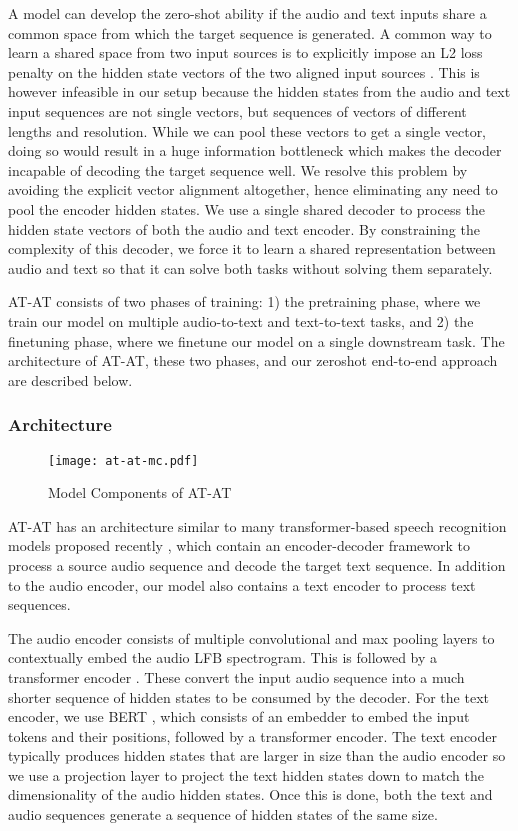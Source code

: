 \documentclass[letterpaper]{article} \usepackage{aaai21}  \usepackage{times}  \usepackage{helvet} \usepackage{courier}  \usepackage[hyphens]{url}  \usepackage{graphicx} \usepackage{booktabs}
\begin{document}
A model can develop the zero-shot ability if the audio and text inputs share a common space from which the target sequence is generated. A common way to learn a shared space from two input sources is to explicitly impose an L2 loss penalty on the hidden state vectors of the two aligned input sources \cite{denisov2020pretrained}. This is however infeasible in our setup because the hidden states from the audio and text input sequences are not single vectors, but sequences of vectors of different lengths and resolution. While we can pool these vectors to get a single vector, doing so would result in a huge information bottleneck which makes the decoder incapable of decoding the target sequence well. We resolve this problem by avoiding the explicit vector alignment altogether, hence eliminating any need to pool the encoder hidden states. We use a single shared decoder to process the hidden state vectors of both the audio and text encoder. By constraining the complexity of this decoder, we force it to learn a shared representation between audio and text so that it can solve both tasks without solving them separately.

AT-AT consists of two phases of training: 1) the pretraining phase, where we train our model on multiple audio-to-text and text-to-text tasks, and 2) the finetuning phase, where we finetune our model on a single downstream task. The architecture of AT-AT, these two phases, and our zeroshot end-to-end approach are described below.

\subsubsection{Architecture}

\begin{figure}[t]
\centering
\texttt{[image: at-at-mc.pdf]}
\caption{Model Components of AT-AT}
\label{at-at-mc}
\end{figure}

AT-AT has an architecture similar to many transformer-based speech recognition models proposed recently \cite{Karita2019ACS,Mohamed2019TransformersWC}, which contain an encoder-decoder framework to process a source audio sequence and decode the target text sequence. In addition to the audio encoder, our model also contains a text encoder to process text sequences.

The audio encoder consists of multiple convolutional and max pooling layers to contextually embed the audio LFB spectrogram. This is followed by a transformer encoder \cite{vaswani2017attention}. These convert the input audio sequence into a much shorter sequence of hidden states to be consumed by the decoder. For the text encoder, we use BERT \cite{devlin2018bert}, which consists of an embedder to embed the input tokens and their positions, followed by a transformer encoder. The text encoder typically produces hidden states that are larger in size than the audio encoder so we use a projection layer to project the text hidden states down to match the dimensionality of the audio hidden states. Once this is done, both the text and audio sequences generate a sequence of hidden states of the same size. 
\end{document}
